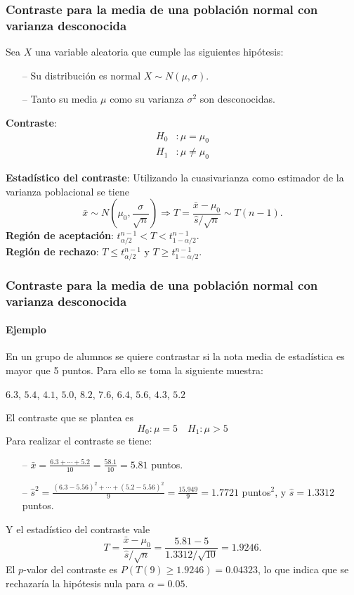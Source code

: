 \begin{frame}
\frametitle{Contraste para la media de una población normal con varianza desconocida}
Sea $X$ una variable aleatoria que cumple las siguientes hipótesis:
\begin{itemize}
\item[--] Su distribución es normal $X\sim N(\mu,\sigma)$.
\item[--] Tanto su media $\mu$ como su varianza $\sigma^2$ son desconocidas.
\end{itemize}

\textbf{Contraste}:
\begin{align*}
H_0 &: \mu=\mu_0\\
H_1 &: \mu\neq \mu_0
\end{align*}

\textbf{Estadístico del contraste}: Utilizando la cuasivarianza como estimador de la varianza poblacional se tiene
\[
\bar x\sim N\left(\mu_0,\frac{\sigma}{\sqrt{n}}\right) \Rightarrow T=\frac{\bar x-\mu_0}{\hat s/\sqrt{n}}\sim T(n-1).
\]
\textbf{Región de aceptación}: $t^{n-1}_{\alpha/2}< T < t^{n-1}_{1-\alpha/2}$.\\
\textbf{Región de rechazo}: $T\leq t^{n-1}_{\alpha/2}$ y $T\geq t^{n-1}_{1-\alpha/2}$.
\end{frame}


\begin{frame}
\frametitle{Contraste para la media de una población normal con varianza desconocida}
\framesubtitle{Ejemplo}
En un grupo de alumnos se quiere contrastar si la nota media de estadística es mayor que 5 puntos.
Para ello se toma la siguiente muestra:
\begin{center}
$6.3$, $5.4$, $4.1$, $5.0$, $8.2$, $7.6$, $6.4$, $5.6$, $4.3$, $5.2$
\end{center}
El contraste que se plantea es
\[
H_0: \mu=5 \quad H_1: \mu>5
\]
Para realizar el contraste se tiene:
\begin{itemize}
\item[--] $\bar x = \frac{6.3+\cdots+5.2}{10}=\frac{58.1}{10}=5.81$ puntos.
\item[--] $\hat s^2 = \frac{(6.3-5.56)^2+\cdots+(5.2-5.56)^2}{9} = \frac{15.949}{9}=1.7721$ puntos$^2$, y $\hat s=1.3312$ puntos.
\end{itemize}
Y el estadístico del contraste vale
\[
T=\frac{\bar x-\mu_0}{\hat s/\sqrt{n}} = \frac{5.81-5}{1.3312/\sqrt{10}}= 1.9246.
\]
El $p$-valor del contraste es $P(T(9)\geq 1.9246) = 0.04323$, lo que indica que se rechazaría la hipótesis nula para $\alpha=0.05$.
\end{frame}


